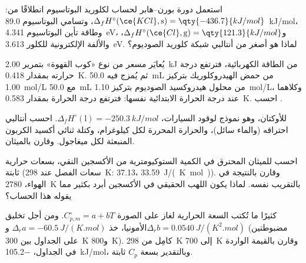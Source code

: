 \begin{exercise}[$\star\star$]\label{exo:b2:reaction-enthalpy:7}
استعمل دورة بورن--هابر لحساب  لكلوريد البوتاسيوم انطلاقًا
من: $\Delta_f H^\circ(\ce{KCl}, \text{s}) = \qty{-436.7}{kJ/mol}$، وتسامي
البوتاسيوم \qty{89.0}{kJ/mol}، وطاقة تأين البوتاسيوم \qty{4.341}{eV}،
و$\Delta_f H^\circ(\ce{Cl}, \text{g}) =
\qty{121.3}{kJ/mol}$، والألفة الإلكترونية للكلور \qty{3.613}{eV}. لماذا هو
أصغر من أنتالبي شبكة كلوريد الصوديوم؟
\end{exercise}

\begin{exercise}[$\star\star$]\label{exo:b2:reaction-enthalpy:8}
يُعايَر مسعر من نوع «كوب القهوة» بتمرير \qty{2.00}{kJ} من الطاقة
الكهربائية، فترتفع درجة حرارته بمقدار \qty{0.418}{K}. ثم يُمزج فيه
\qty{50.0}{mL} من حمض الهيدروكلوريك بتركيز \qty{1.00}{mol/L} مع
\qty{50.0}{mL} من محلول هيدروكسيد الصوديوم بتركيز \qty{1.10}{mol/L}،
وكلاهما عند درجة الحرارة الابتدائية نفسها: فترتفع درجة الحرارة بمقدار
\qty{0.583}{K}. احسب  .
\end{exercise}

\begin{exercise}[$\star\star$]\label{exo:b2:reaction-enthalpy:9}
للأوكتان، وهو نموذج لوقود السيارات، $\Delta_f H^\circ(\text{l}) =
\qty{-250.3}{kJ/mol}$. احسب أنتالبي احتراقه (والماء سائل)، والحرارة
المحررة لكل كيلوغرام، وكتلة ثنائي أكسيد الكربون المنبعثة لكل ميغاجول.
وقارن بالميثان.
\end{exercise}

\begin{exercise}[$\star\star\star$]\label{exo:b2:reaction-enthalpy:10}
احسب  للميثان المحترق في الكمية الستوكيومترية
من الأكسجين النقي، بسعات حرارية ثابتة (سعات الفصل عند \qty{298}{K}:
 37.13، 
\qty{33.59}{J/(K.mol)}). وقارن بالنتيجة في الهواء، \qty{2780}{K} بالتقريب
نفسه. لماذا يكون اللهب الحقيقي في الأكسجين أبرد بكثير مما يقوله هذا
الحساب؟
\end{exercise}

\begin{exercise}[$\star\star\star$]\label{exo:b2:reaction-enthalpy:11}
كثيرًا ما تُكتب السعة الحرارية لغاز على الصورة $C_{p,m}^\circ = a + bT$. ومن
أجل تخليق الأمونيا، خذ $\Delta_r a = \qty{-60.5}{J/(K.mol)}$
و$\Delta_r b = \qty{0.0540}{J/(K^2.mol)}$ (مضبوطتين على الجداول بين
\qty{300}{K} و\qty{800}{K}). كامِل  من \qty{298}{K} إلى
\qty{700}{K} وقارن بالقيمة الواردة في الجداول، \qty{-105.2}{kJ/mol}،
وبالتقدير بسعة $C_p$ ثابتة.
\end{exercise}

